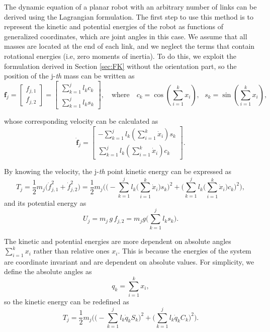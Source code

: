 \documentclass[10pt,a4paper]{article} %
\begin{document}
The dynamic equation of a planar robot with an arbitrary number of links can be derived using the Lagrangian formulation. The first step to use this method is to represent the kinetic and potential energies of the robot as functions of generalized coordinates, which are joint angles in this case. We assume that all masses are located at the end of each link, and we neglect the terms that contain rotational energies (i.e, zero moments of inertia). To do this, we exploit the formulation derived in Section \ref{sec:FK} without the orientation part, so the position of the j-\emph{th} mass can be written as 
\begin{equation}
	\bm{f}_j = \begin{bmatrix}
	f_{j,1} \\ f_{j,2}
	\end{bmatrix} = \begin{bmatrix}
	\sum_{k=1}^j l_k c_k \\ \sum_{k=1}^j l_k s_k
	\end{bmatrix},  
	\quad\text{where}\quad
    c_k = \cos(\sum_{i=1}^{k} x_i), \ \ \ s_k = \sin(\sum_{i=1}^{k} x_i), 
    \label{eq:position}
\end{equation}

whose corresponding velocity can be calculated as
\begin{equation*}
	\bm{\dot{f}}_j = \begin{bmatrix} 
	-\sum_{k=1}^j l_k (\sum_{i=1}^{k} \dot{x}_i) s_k \\ \sum_{k=1}^j l_k (\sum_{i=1}^{k} \dot{x}_i) c_k
	\end{bmatrix}.
\end{equation*}

By knowing the velocity, the j-\emph{th} point kinetic energy can be expressed as
\begin{equation*}
	T_j = \frac{1}{2} m_j \big(\dot{f}_{j,1}^2+\dot{f}_{j,2}^2\big) 
	= \frac{1}{2} m_j \Bigg(\!\!\Big(\!-\sum_{k=1}^j l_k \Big(\sum_{i=1}^{k} \dot{x}_i\Big) s_k \!\Big)^{\!2} \!+\! 
	\Big(\sum_{k=1}^j l_k \Big(\sum_{i=1}^{k} \dot{x}_i\Big) c_k \!\Big)^{\!2}\!\Bigg), 
\end{equation*}
and its potential energy as
\begin{equation*}
	U_j = m_j \, g \, f_{j,2} =  m_j g \Big(\sum_{k=1}^j l_k s_k\Big).
\end{equation*}

The kinetic and potential energies are more dependent on absolute angles $\sum_{i=1}^{k}x_i$ rather than relative ones $x_i$. This is because the energies of the system are coordinate invariant and are dependent on absolute values. For simplicity, we define the absolute angles as 
\begin{equation*}
    q_k = \sum_{i=1}^{k} x_i,
\end{equation*}
so the kinetic energy can be redefined as
\begin{equation*}\label{eq:kinetic}
	T_j = \frac{1}{2} m_j \Big(\Big(-\sum_{k=1}^j l_k \dot{q}_k S_k\Big)^2+\Big(\sum_{k=1}^j l_k \dot{q}_{k} C_k\Big)^2\Big). 
\end{equation*}
\end{document}
